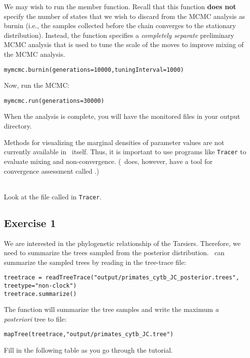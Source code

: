 We may wish to run the  member function.
Recall that this function \textbf{does not} specify the number of states that we wish to discard from the MCMC analysis as burnin (i.e., the samples collected before the chain converges to the stationary distribution).  
Instead, the  function specifies a \textit{completely separate} preliminary MCMC analysis that is used to tune the scale of the moves to improve mixing of the MCMC analysis.
{\tt \begin{snugshade*}
\begin{lstlisting}
mymcmc.burnin(generations=10000,tuningInterval=1000)
\end{lstlisting}
\end{snugshade*}}


Now, run the MCMC:
{\tt \begin{snugshade*}
\begin{lstlisting}
mymcmc.run(generations=30000)
\end{lstlisting}
\end{snugshade*}}

When the analysis is complete, you will have the monitored files in your output directory.


Methods for visualizing the marginal densities of parameter values are not currently available in \RevBayes~itself. 
Thus, it is important to use programs like \texttt{Tracer} \citep{Rambaut2011} to evaluate mixing and non-convergence. (\RevBayes~does, however, have a tool for convergence assessment called .)

\noindent \\ \impmark Look at the file called  in \texttt{Tracer}.


\subsection{Exercise 1}

We are interested in the phylogenetic relationship of the Tarsiers. Therefore, we need to summarize the trees sampled from the posterior distribution.
\RevBayes~can summarize the sampled trees by reading in the tree-trace file:
{\tt \begin{snugshade*}
\begin{lstlisting}
treetrace = readTreeTrace("output/primates_cytb_JC_posterior.trees", treetype="non-clock")
treetrace.summarize()
\end{lstlisting}
\end{snugshade*}}
The  function will summarize the tree samples and write the maximum \textit{a posteriori} tree to file:
{\tt \begin{snugshade*}
\begin{lstlisting}
mapTree(treetrace,"output/primates_cytb_JC.tree")
\end{lstlisting}
\end{snugshade*}}
Fill in the following table as you go through the tutorial.

